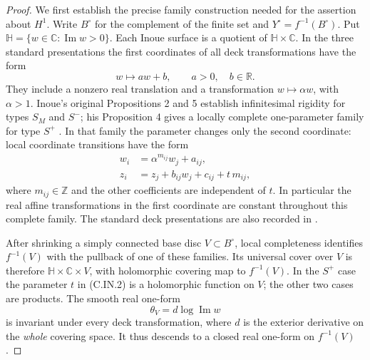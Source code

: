 \begin{proof}
We first establish the precise family construction needed for the
assertion about $H^1$. Write $B^\circ$ for the complement of the
finite set and $Y^\circ=f^{-1}(B^\circ)$. Put
$\mathbb H=\{w\in\mathbb C:\operatorname{Im}w>0\}$.
Each Inoue surface is a quotient of $\mathbb H\times\mathbb C$.
In the three standard presentations the first coordinates of all
deck transformations have the form
\[
 w\longmapsto a w+b,\qquad a>0,\quad b\in\mathbb R.
\tag{C.IN.1}
\]
They include a nonzero real translation and a transformation
$w\mapsto\alpha w$, with $\alpha>1$. Inoue's original
Propositions 2 and 5 establish infinitesimal rigidity for types
$S_M$ and $S^{-}$; his Proposition 4 gives a locally complete
one-parameter family for type $S^{+}$
\cite[pp.~274, 278, 280]{Inoue1974}.
In that family the parameter changes only the second coordinate:
local coordinate transitions have the form
\[
\begin{aligned}
 w_i&=\alpha^{m_{ij}}w_j+a_{ij},\\
 z_i&=z_j+b_{ij}w_j+c_{ij}+t\,m_{ij},
\end{aligned}
\tag{C.IN.2}
\]
where $m_{ij}\in\mathbb Z$ and the other coefficients are
independent of $t$. In particular the real affine transformations
in the first coordinate are constant throughout this complete
family. The standard deck presentations are also recorded in
\cite[Sections 2.1--2.3]{KhaledTeleman2026}.

After shrinking a simply connected base disc $V\subset B^\circ$,
local completeness identifies $f^{-1}(V)$ with the pullback of one
of these families. Its universal cover over $V$ is therefore
$\mathbb H\times\mathbb C\times V$, with holomorphic covering
map to $f^{-1}(V)$. In the $S^{+}$ case the parameter $t$ in
(C.IN.2) is a holomorphic function on $V$; the other two cases
are products. The smooth real one-form
\[
 \theta_V=d\log\operatorname{Im}w
\tag{C.IN.3}
\]
is invariant under every deck transformation, where $d$ is the
exterior derivative on the \emph{whole} covering space. It thus
descends to a closed real one-form on $f^{-1}(V)$.


\end{proof}
